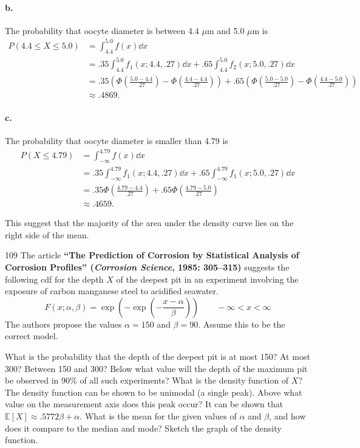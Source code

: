 \documentclass{exam}
\newcommand{\paren}[1]{\left(#1\right)}
\begin{document}
\paragraph{b.} The probability that oocyte diameter is between 4.4 $\mu$m and 5.0 $\mu$m is
\begin{align*}
	P(4.4 \le X \le 5.0) &= \int_{4.4}^{5.0} f(x) \dd x \\
	&= .35\int_{4.4}^{5.0} f_1(x; 4.4, .27)\dd x + .65\int_{4.4}^{5.0} f_2(x; 5.0, .27)\dd x \\
	&= .35\paren{\Phi\paren{\frac{5.0 - 4.4}{.27}} - \Phi\paren{\frac{4.4 - 4.4}{.27}}} + .65\paren{\Phi\paren{\frac{5.0 - 5.0}{.27}} - \Phi\paren{\frac{4.4 - 5.0}{.27}}} \\
	&\approx .4869.
\end{align*}

\paragraph{c.} The probability that oocyte diameter is smaller than 4.79 is
\begin{align*}
	P(X \le 4.79) &= \int_{-\infty}^{4.79} f(x)\dd x \\
	&= .35\int_{-\infty}^{4.79} f_1(x; 4.4, .27)\dd x + .65\int_{-\infty}^{4.79} f_1(x; 5.0, .27)\dd x \\
	&= .35\Phi\paren{\frac{4.79 - 4.4}{.27}} + .65\Phi\paren{\frac{4.79 - 5.0}{.27}} \\
	&\approx .4659.
\end{align*}

This suggest that the majority of the area under the density curve lies on the right side of the mean.

\begin{problem}{109}
	The article \textbf{``The Prediction of Corrosion by Statistical Analysis of Corrosion Profiles'' (\textit{Corrosion Science}, 1985: 305--315)} suggests the following cdf for the depth $X$ of the deepest pit in an experiment involving the exposure of carbon manganese steel to acidified seawater.
	\[
		F(x; \alpha, \beta) = \exp\paren{-\exp\paren{-\frac{x - \alpha}{\beta}}} \qquad -\infty < x < \infty
	\]
	The authors propose the values $\alpha = 150$ and $\beta = 90$. Assume this to be the correct model.
	\begin{tasks}[label=\textbf{\alph*.}]
		\task What is the probability that the depth of the deepest pit is at most 150? At most 300? Between 150 and 300?
		\task Below what value will the depth of the maximum pit be observed in 90\% of all such experiments?
		\task What is the density function of $X$?
		\task The density function can be shown to be unimodal (a single peak). Above what value on the measurement axis does this peak occur?
		\task It can be shown that $\mathbb E[X] \approx .5772\beta + \alpha$. What is the mean for the given values of $\alpha$ and $\beta$, and how does it compare to the median and mode? Sketch the graph of the density function.
	\end{tasks}
\end{problem}
\end{document}
